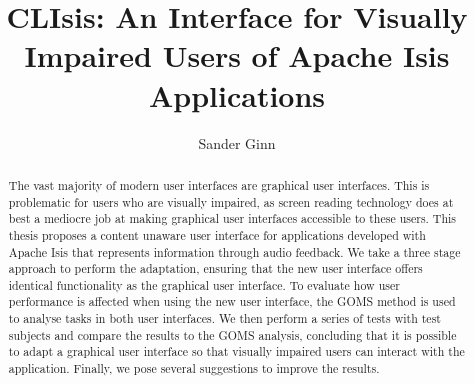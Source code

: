 \documentclass{uva_bachelor_thesis}
\title{CLIsis: An Interface for Visually Impaired Users of Apache Isis Applications}
\author{Sander Ginn}
\begin{document}
\maketitle

\begin{abstract}
The vast majority of modern user interfaces are graphical user interfaces. This is problematic for users who are visually impaired, as screen reading technology does at best a mediocre job at making graphical user interfaces accessible to these users. This thesis proposes a content unaware user interface for applications developed with Apache Isis that represents information through audio feedback. We take a three stage approach to perform the adaptation, ensuring that the new user interface offers identical functionality as the graphical user interface. To evaluate how user performance is affected when using the new user interface, the GOMS method is used to analyse tasks in both user interfaces. We then perform a series of tests with test subjects and compare the results to the GOMS analysis, concluding that it is possible to adapt a graphical user interface so that visually impaired users can interact with the application. Finally, we pose several suggestions to improve the results.
\end{abstract}

\tableofcontents










\printglossaries

\end{document}

